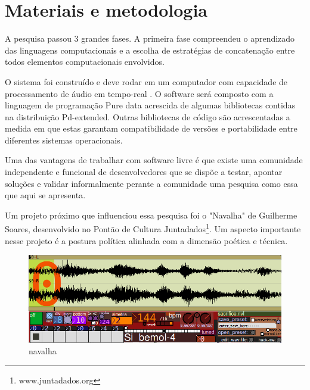 \documentclass{ppgmus}
\begin{document}
\chapter{Materiais e metodologia}
\label{sec:metodologia}

A pesquisa passou 3 grandes fases.  A primeira fase
compreendeu o aprendizado das linguagens computacionais e a
escolha de estratégias de concatenação entre todos elementos
computacionais envolvidos. 

O sistema foi construído e deve rodar em um computador com capacidade de processamento
de áudio em tempo-real . O software será composto com
a linguagem de programação Pure data acrescida de algumas bibliotecas contidas
na distribuição Pd-extended. Outras bibliotecas de código são
acrescentadas a medida em que estas garantam compatibilidade de
versões e portabilidade entre diferentes sistemas operacionais.



Uma das vantagens de trabalhar com software livre é que existe uma
comunidade independente e funcional de desenvolvedores que se dispõe a
testar, apontar soluções e validar informalmente perante a comunidade
uma pesquisa como essa que aqui se apresenta.

Um projeto próximo que influenciou essa pesquisa foi o "Navalha"
de Guilherme Soares, desenvolvido no Pontão de Cultura Juntadados\footnote{www.juntadados.org}.
Um aspecto importante nesse projeto é a postura política alinhada com a dimensão
poética e técnica.

\begin{figure}[-h]
\includegraphics[scale=.6]{navalha}
\caption{navalha}
\label{navalha}
\end{figure}
\end{document}
